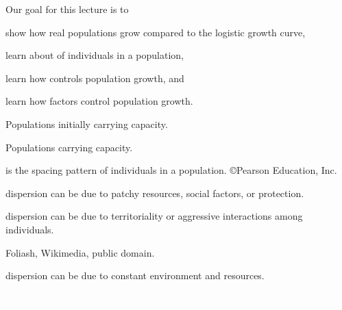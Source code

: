 \documentclass[t]{beamer}
\begin{document}

\begin{frame}{Our goal for this lecture is to}

	\hangpara show how real populations grow compared to the logistic growth curve,

	\hangpara learn about  of individuals in a population,

	\hangpara learn how  controls  population growth, and
	
	\hangpara learn how  factors control population growth.
	
\end{frame}
%
{
\begin{frame}{Populations initially  carrying capacity.}
\end{frame}
}
%
{
	\begin{frame}{Populations  carrying capacity.}
	\end{frame}
}
%
{
	\begin{frame}[b]{ is the spacing pattern of individuals in a population.}
		\hfill \tiny \copyright Pearson Education, Inc.
	\end{frame}
}
%
{
	\begin{frame}[b]{ dispersion can be due to patchy resources, social factors, or protection.}
	\end{frame}
}
%
{
	\begin{frame}[t]{ dispersion can be due to territoriality or aggressive interactions among individuals.}
		
		\vfilll 
		
		\tiny\textcolor{orange5}{Foliash, Wikimedia, public domain.}
	\end{frame}
}
%
{
	\begin{frame}[t]{ dispersion can be due to constant environment and resources.}
		
		\vfilll 
		
		\tiny \textcolor{white}{Strecosa, Pixabay, .}
	\end{frame}
}
\end{document}
